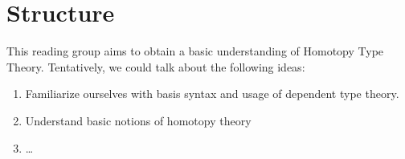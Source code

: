 \documentclass[11pt]{article}
\begin{document}
\section*{Structure}

This reading group aims to obtain a basic understanding of Homotopy Type Theory. Tentatively, we could talk about the following ideas:

\begin{enumerate}
\item Familiarize ourselves with basis syntax and usage of dependent type theory.
\item Understand basic notions of homotopy theory
\item \dots
\end{enumerate}


\section*{}
\end{document}
